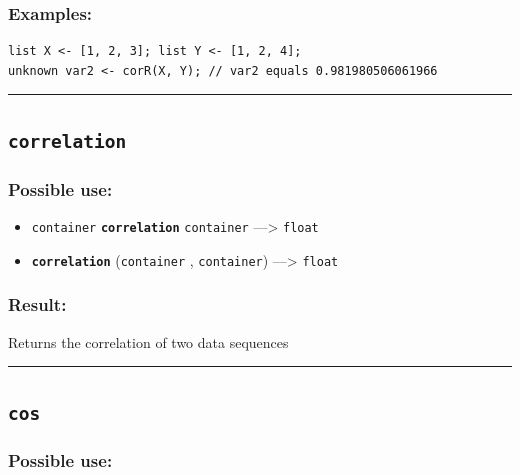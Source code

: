 \documentclass[]{book}
\providecommand{\tightlist}{%
  \setlength{\itemsep}{0pt}\setlength{\parskip}{0pt}}
\theoremstyle{definition}
\theoremstyle{definition}
\theoremstyle{definition}
\theoremstyle{remark}
\begin{document}
\subsubsection{Examples:}\label{examples-83}

\begin{verbatim}
list X <- [1, 2, 3]; list Y <- [1, 2, 4];  
unknown var2 <- corR(X, Y); // var2 equals 0.981980506061966
\end{verbatim}

\begin{center}\rule{0.5\linewidth}{\linethickness}\end{center}

\subsection{\texorpdfstring{\texttt{correlation}}{correlation}}\label{correlation}

\subsubsection{Possible use:}\label{possible-use-109}

\begin{itemize}
\tightlist
\item
  \texttt{container} \textbf{\texttt{correlation}} \texttt{container}
  ---\textgreater{} \texttt{float}
\item
  \textbf{\texttt{correlation}} (\texttt{container} ,
  \texttt{container}) ---\textgreater{} \texttt{float}
\end{itemize}

\subsubsection{Result:}\label{result-106}

Returns the correlation of two data sequences

\begin{center}\rule{0.5\linewidth}{\linethickness}\end{center}

\subsection{\texorpdfstring{\texttt{cos}}{cos}}\label{cos}

\subsubsection{Possible use:}\label{possible-use-110}
\end{document}
